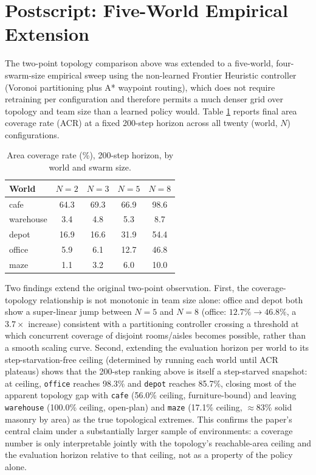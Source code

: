 \documentclass[12pt]{article}
\begin{document}
\section{Postscript: Five-World Empirical Extension}
The two-point topology comparison above was extended to a five-world,
four-swarm-size empirical sweep using the non-learned Frontier Heuristic
controller (Voronoi partitioning plus A* waypoint routing), which does not
require retraining per configuration and therefore permits a much denser
grid over topology and team size than a learned policy would. Table
\ref{tab:topo-sweep} reports final area coverage rate (ACR) at a fixed
200-step horizon across all twenty (world, $N$) configurations.

\begin{table}[h]
\centering
\caption{Area coverage rate (\%), 200-step horizon, by world and swarm size.}
\label{tab:topo-sweep}
\begin{tabular}{lcccc}
\hline
World & $N{=}2$ & $N{=}3$ & $N{=}5$ & $N{=}8$ \\
\hline
cafe      & 64.3 & 69.3 & 66.9 & 98.6 \\
warehouse & 3.4  & 4.8  & 5.3  & 8.7 \\
depot     & 16.9 & 16.6 & 31.9 & 54.4 \\
office    & 5.9  & 6.1  & 12.7 & 46.8 \\
maze      & 1.1  & 3.2  & 6.0  & 10.0 \\
\hline
\end{tabular}
\end{table}

Two findings extend the original two-point observation. First, the
coverage-topology relationship is not monotonic in team size alone: office
and depot both show a super-linear jump between $N{=}5$ and $N{=}8$
(office: $12.7\%\to46.8\%$, a $3.7\times$ increase) consistent with a
partitioning controller crossing a threshold at which concurrent coverage
of disjoint rooms/aisles becomes possible, rather than a smooth scaling
curve. Second, extending the evaluation horizon per world to its
step-starvation-free ceiling (determined by running each world until ACR
plateaus) shows that the 200-step ranking above is itself a step-starved
snapshot: at ceiling, \texttt{office} reaches 98.3\% and \texttt{depot}
reaches 85.7\%, closing most of the apparent topology gap with
\texttt{cafe} (56.0\% ceiling, furniture-bound) and leaving
\texttt{warehouse} (100.0\% ceiling, open-plan) and \texttt{maze} (17.1\%
ceiling, $\approx$83\% solid masonry by area) as the true topological
extremes. This confirms the paper's central claim under a substantially
larger sample of environments: a coverage number is only interpretable
jointly with the topology's reachable-area ceiling and the evaluation
horizon relative to that ceiling, not as a property of the policy alone.



\end{document}
